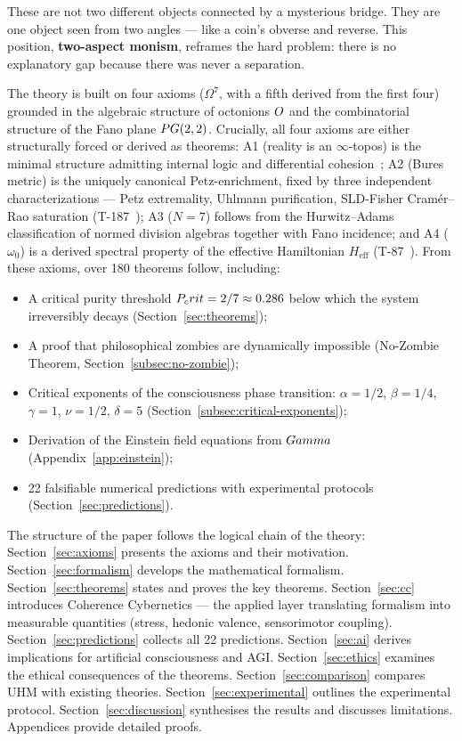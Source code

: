 These are not two different objects connected by a mysterious bridge. They
are one object seen from two angles --- like a coin's obverse and reverse.
This position, \textbf{two-aspect monism}, reframes the hard problem: there
is no explanatory gap because there was never a separation.

The theory is built on four axioms ($\Omega^{7}$, with a fifth derived from
the first four) grounded in the algebraic structure of octonions $O$ and
the combinatorial structure of the Fano plane $PG(2,2)$. Crucially, all four
axioms are either structurally forced or derived as theorems:
A1 (reality is an $\infty$-topos) is the minimal structure admitting internal
logic and differential cohesion~\cite{lurie2009}; A2 (Bures metric) is the
uniquely canonical Petz-enrichment, fixed by three independent characterizations --- Petz extremality, Uhlmann purification, SLD-Fisher Cram\'{e}r--Rao saturation (T-187~);
A3 ($N = 7$) follows from the Hurwitz--Adams classification of normed
division algebras together with Fano incidence; and A4 ($\omega_{0}$) is a
derived spectral property of the effective Hamiltonian $H_{\mathrm{eff}}$
(T-87~). From these axioms, over 180 theorems follow, including:

\begin{itemize}[leftmargin=2em]
  \item A critical purity threshold $P_crit = 2/7 \approx 0.286$ below which the system
        irreversibly decays (Section~\ref{sec:theorems});
  \item A proof that philosophical zombies are dynamically impossible
        (No-Zombie Theorem, Section~\ref{subsec:no-zombie});
  \item Critical exponents of the consciousness phase transition:
        $\alpha = 1/2$, $\beta = 1/4$, $\gamma = 1$, $\nu = 1/2$, $\delta = 5$
        (Section~\ref{subsec:critical-exponents});
  \item Derivation of the Einstein field equations from $Gamma$
        (Appendix~\ref{app:einstein});
  \item 22 falsifiable numerical predictions with experimental protocols
        (Section~\ref{sec:predictions}).
\end{itemize}

The structure of the paper follows the logical chain of the theory:
Section~\ref{sec:axioms} presents the axioms and their motivation.
Section~\ref{sec:formalism} develops the mathematical formalism.
Section~\ref{sec:theorems} states and proves the key theorems.
Section~\ref{sec:cc} introduces Coherence Cybernetics --- the applied layer translating
formalism into measurable quantities (stress, hedonic valence, sensorimotor coupling).
Section~\ref{sec:predictions} collects all 22 predictions.
Section~\ref{sec:ai} derives implications for artificial consciousness and AGI.
Section~\ref{sec:ethics} examines the ethical consequences of the theorems.
Section~\ref{sec:comparison} compares UHM with existing theories.
Section~\ref{sec:experimental} outlines the experimental protocol.
Section~\ref{sec:discussion} synthesises the results and discusses limitations.
Appendices provide detailed proofs.


